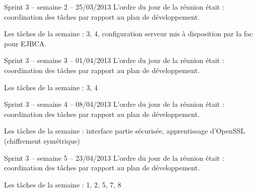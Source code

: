 \documentclass[a4paper,11pt,french]{article}
\begin{document}
\begin{paragraph}{Sprint 3 -- semaine 2 -- 25/03/2013}
L’ordre du jour de la réunion était : coordination des tâches par rapport au plan de développement.

Les tâches de la semaine : 3, 4, configuration serveur mis à disposition par la fac pour EJBCA.
\end{paragraph}

\begin{paragraph}{Sprint 3 -- semaine 3 -- 01/04/2013}
L’ordre du jour de la réunion était : coordination des tâches par rapport au plan de développement.

Les tâches de la semaine : 3, 4
\end{paragraph}

\begin{paragraph}{Sprint 3 -- semaine 4 -- 08/04/2013}
L’ordre du jour de la réunion était : coordination des tâches par rapport au plan de développement.

Les tâches de la semaine : interface partie sécurisée, apprentissage d'OpenSSL (chiffrement symétrique)
\end{paragraph}

\begin{paragraph}{Sprint 3 -- semaine 5 -- 23/04/2013}
L’ordre du jour de la réunion était : coordination des tâches par rapport au plan de développement.

Les tâches de la semaine : 1, 2, 5, 7, 8
\end{paragraph}
\end{document}

